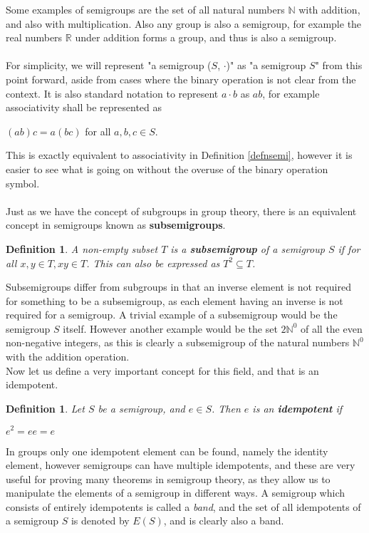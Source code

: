 \documentclass[12pt]{article}
\newtheorem{defn}[theorem]{Definition}
\begin{document}
\noindent Some examples of semigroups are the set of all natural numbers $\mathbb{N}$ with addition, and also with multiplication\cite{2}. Also any group is also a semigroup\cite{1}, for example the real numbers $\mathbb{R}$ under addition forms a group, and thus is also a semigroup.\\
\\For simplicity, we will represent "a semigroup ($S$, $\cdot$)" as "a semigroup $S$" from this point forward, aside from cases where the binary operation is not clear from the context. It is also standard notation to represent $a \cdot b$ as $ab$, for example associativity shall be represented as
\begin{center}
	$(ab)c=a(bc)$ \qquad for all $a, b, c \in S.$
\end{center}
This is exactly equivalent to associativity in Definition \ref{defnsemi}, however it is easier to see what is going on without the overuse of the binary operation symbol.\\
\\Just as we have the concept of subgroups in group theory, there is an equivalent concept in semigroups known as \textbf{subsemigroups}.
\begin{defn}\label{def2.10}
	A non-empty subset $T$ is a \textbf{subsemigroup} of a semigroup $S$ if for all $x, y \in T, xy \in T$. This can also be expressed as $T^2 \subseteq T$.
\end{defn}
\noindent Subsemigroups differ from subgroups in that an inverse element is not required for something to be a subsemigroup, as each element having an inverse is not required for a semigroup. A trivial example of a subsemigroup would be the semigroup $S$ itself. However another example would be the set $2\mathbb{N}^0$ of all the even non-negative integers, as this is clearly a subsemigroup of the natural numbers $\mathbb{N}^0$ with the addition operation\cite{1}.\\
Now let us define a very important concept for this field, and that is an idempotent.
\begin{defn}\label{def2.8}
	Let $S$ be a semigroup, and $e \in S$. Then $e$ is an \textbf{idempotent} if
	\begin{center}
		$e^2=ee=e$
	\end{center}
\end{defn}
\noindent In groups only one idempotent element can be found, namely the identity element, however semigroups can have multiple idempotents, and these are very useful for proving many theorems in semigroup theory, as they allow us to manipulate the elements of a semigroup in different ways. A semigroup which consists of entirely idempotents is called a \textit{band}, and the set of all idempotents of a semigroup $S$ is denoted by $E(S)$, and is clearly also a band.
\end{document}
